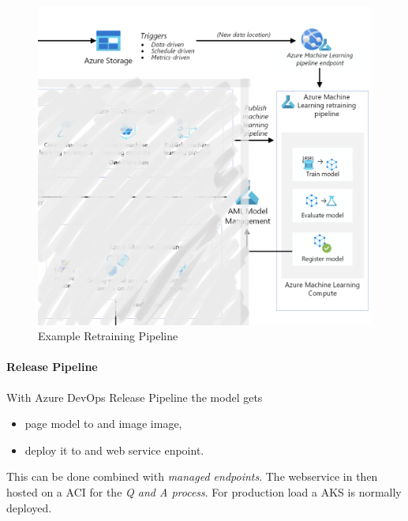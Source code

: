 \begin{figure}[H]
	\centering
	\includegraphics[scale = 0.2]{attachment/chapter_10/Scc023}
	\caption{Example Retraining Pipeline}
\end{figure}

\paragraph{Release Pipeline}
With Azure DevOps Release Pipeline the model gets
\begin{itemize}
	\item page model to and image image,
	\item deploy it to and web service enpoint. 
\end{itemize}
This can be done combined with \textit{managed endpoints}. The webservice in then hosted on a \gls{ACI} for the \textit{Q and A process}. For production load a \gls{AKS} is normally deployed.

